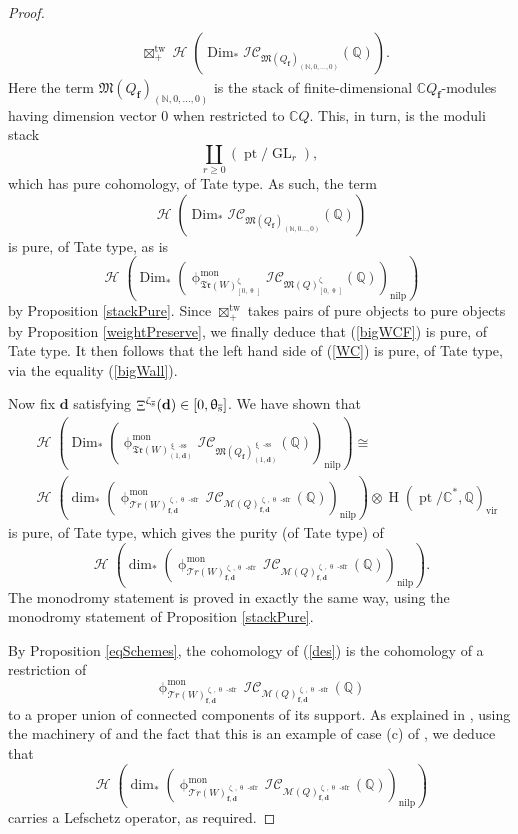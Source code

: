 \documentclass[a4paper,10pt]{amsart}
\newcommand{\BC}{\pt/\mathbb{C}^*}
\newcommand{\dd}{\mathbf{d}}
\newcommand{\ff}{\mathbf{f}}
\newcommand{\QQ}{\mathbb{Q}}
\DeclareMathOperator{\sfr}{-sfr}
\newcommand{\WW}{\mathcal{T}r(W)}
\newcommand{\WWW}{\mathfrak{Tr}(W)}
\newcommand{\Mst}{\mathfrak{M}}
\newcommand{\Msp}{\mathcal{M}}
\newcommand{\ICS}{\mathcal{IC}}
\newcommand{\phim}[1]{\phi^{\mon}_{#1}}
\renewcommand{\theta}{\uptheta}
\renewcommand{\zeta}{\upzeta}
\renewcommand{\xi}{\upxi}
\renewcommand{\phi}{\upphi}
\DeclareMathOperator{\sst}{-ss}
\DeclareMathOperator{\nilp}{nilp}
\DeclareMathOperator{\Dim}{Dim}
\DeclareMathOperator{\tw}{tw}
\DeclareMathOperator{\mon}{mon}
\DeclareMathOperator{\Mu}{\Upxi}
\DeclareMathOperator{\Gl}{GL}
\DeclareMathOperator{\pt}{pt}
\DeclareMathOperator{\Ss}{\overline{s}}
\DeclareMathOperator{\vir}{vir}
\DeclareMathOperator{\Ho}{\mathcal{H}}
\DeclareMathOperator{\HO}{H}
\begin{document}
\begin{proof}
\begin{align}
\\
&\boxtimes_+^{\tw}\Ho\left(\Dim_*\ICS_{\Mst(Q_{\ff})_{(\mathbb{N},0,\ldots,0)}}(\mathbb{Q})\right).\nonumber
\end{align}
Here the term $\Mst(Q_{\ff})_{(\mathbb{N},0,\ldots,0)}$ is the stack of finite-dimensional $\mathbb{C}Q_{\ff}$-modules having dimension vector $0$ when restricted to $\mathbb{C}Q$.  This, in turn, is the moduli stack 
\[
\coprod_{r\geq 0} (\pt/\Gl_r),
\]
which has pure cohomology, of Tate type.  As such, the term 
\[
\Ho\left(\Dim_*\ICS_{\Mst(Q_{\ff})_{(\mathbb{N},0\ldots,0)}}(\mathbb{Q})\right)
\]
is pure, of Tate type, as is 
\[
\Ho\left(\Dim_*\left(\phim{\WWW_{[0,\theta_{\Ss}]}^{\zeta_{\Ss}}}\ICS_{\Mst(Q)_{[0,\theta_{\Ss}]}^{\zeta_{\Ss}}}(\QQ)\right)_{\nilp}\right)
\]
by Proposition \ref{stackPure}.  Since $\boxtimes_{+}^{\tw}$ takes pairs of pure objects to pure objects by Proposition \ref{weightPreserve}, we finally deduce that (\ref{bigWCF}) is pure, of Tate type.  It then follows that the left hand side of (\ref{WC}) is pure, of Tate type, via the equality (\ref{bigWall}).  

Now fix $\dd$ satisfying $\Mu^{\zeta_{\Ss}}(\dd)\in[0,\theta_{\Ss}]$.  We have shown that 
\begin{align}\label{extraq}
&\Ho\left(\Dim_*\left(\phim{\WWW_{(1,\dd)}^{\xi\sst}}\ICS_{\Mst(Q_\ff)_{(1,\dd)}^{\xi\sst}}(\mathbb{Q})\right)_{\nilp}\right)\cong \\ \nonumber
&\Ho\left(\dim_*\left(\phim{\WW_{\ff,\dd}^{\zeta_{\Ss},\theta_{\Ss}\sfr}}\ICS_{\Msp(Q)_{\ff,\dd}^{\zeta_{\Ss},\theta_{\Ss}\sfr}}(\QQ)\right)_{\nilp}\right)\otimes\HO(\BC,\QQ)_{\vir}
\end{align}
is pure, of Tate type, which gives the purity (of Tate type) of
\begin{equation}
\label{des}
\Ho\left(\dim_*\left(\phim{\WW_{\ff,\dd}^{\zeta_{\Ss},\theta_{\Ss}\sfr}}\ICS_{\Msp(Q)_{\ff,\dd}^{\zeta_{\Ss},\theta_{\Ss}\sfr}}(\QQ)\right)_{\nilp}\right).
\end{equation}
The monodromy statement is proved in exactly the same way, using the monodromy statement of Proposition \ref{stackPure}.  

By Proposition \ref{eqSchemes}, the cohomology of (\ref{des}) is the cohomology of a restriction of 
\[
\phim{\WW_{\ff,\dd}^{\zeta_{\Ss},\theta_{\Ss}\sfr}}\ICS_{\Msp(Q)_{\ff,\dd}^{\zeta_{\Ss},\theta_{\Ss}\sfr}}(\QQ)
\]
to a proper union of connected components of its support.  As explained in \cite[Thm.2.3]{DMSS13}, using the machinery of \cite{Sa88} and the fact that this is an example of case (c) of \cite[Thm.2.1]{DMSS13}, we deduce that 
\[
\Ho\left(\dim_*\left(\phim{\WW_{\ff,\dd}^{\zeta_{\Ss},\theta_{\Ss}\sfr}}\ICS_{\Msp(Q)_{\ff,\dd}^{\zeta_{\Ss},\theta_{\Ss}\sfr}}(\QQ)\right)_{\nilp}\right)
\]
carries a Lefschetz operator, as required.\end{proof}
\end{document}

